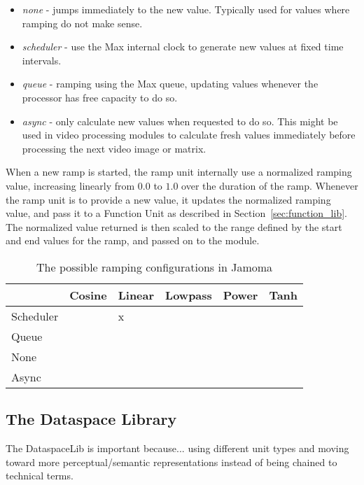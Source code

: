 \documentclass{article}
\begin{document}
\begin{itemize}
	\item \emph{none} - jumps immediately to the new value. Typically used for values where ramping do not make sense.
	\item \emph{scheduler} - use the Max internal clock to generate new values at fixed time intervals.
	\item \emph{queue} - ramping using the Max queue, updating values whenever the processor has free capacity to do so.
	\item \emph{async} - only calculate new values when requested to do so. This might be used in video processing modules to calculate fresh values immediately before processing the next video image or matrix.
\end{itemize}

When a new ramp is started, the ramp unit internally use a normalized ramping value, increasing linearly from $0.0$ to $1.0$ over the duration of the ramp. Whenever the ramp unit is to provide a new value, it updates the normalized ramping value, and pass it to a Function Unit as described in Section~\ref{sec:function_lib}. The normalized value returned is then scaled to the range defined by the start and end values for the ramp, and passed on to the module.

\begin{table}
\begin{center}
\begin{tabular}{|l|l|l|l|l|l|}
\hline
          & Cosine & Linear & Lowpass & Power & Tanh \\
\hline
Scheduler &        &   x    &         &       & \\
\hline
Queue	  &        &        &         &       & \\
\hline
None	  &        &        &         &       & \\
\hline
Async	  &        &        &         &       & \\
\hline
\end{tabular}
\end{center}
\caption{The possible ramping configurations in Jamoma}
\label{tab:ramp_possibilities} %
\end{table}


\subsection{The Dataspace Library} %
\label{sec:dataspacelib}
The DataspaceLib is important because...
using different unit types and moving toward more perceptual/semantic representations instead of being chained to technical terms.
\end{document}

